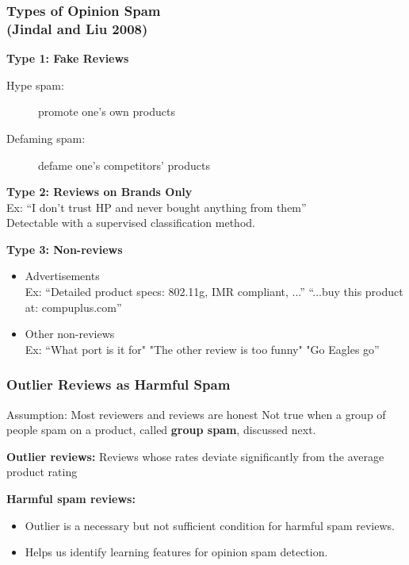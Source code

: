 \documentclass[t]{beamer}
\begin{document}
\begin{frame} \frametitle{Types of Opinion Spam \\ \small{(Jindal and Liu 2008) 
}}  %
  
\textbf{Type 1: Fake Reviews}  \\
\begin{description}
\item [Hype spam:] promote one's own products  
\item [Defaming spam:] defame one's competitors' products
\end{description}

\vfill
\textbf{Type 2: Reviews on Brands Only} \\
Ex: ``I don't trust HP and never bought anything from them''\\
Detectable with a supervised classification method.

\vfill
\textbf{Type 3: Non-reviews} \\
\begin{itemize}
\item Advertisements \\
Ex: ``Detailed product specs: 802.11g, IMR compliant, ...'' ``...buy this product at: compuplus.com''
\item Other non-reviews \\
Ex: ``What port is it for" "The other review is too funny" "Go Eagles go''
\end{itemize}

\end{frame}




\begin{frame} \frametitle{Outlier Reviews as Harmful Spam} %

\begin{block}{Assumption: Most reviewers and reviews are honest}
Not true when a group of people spam on a product, called \textbf{group spam},
discussed next.
\end{block}
\vfill

\textbf{Outlier reviews:} Reviews whose rates deviate significantly from the average product rating 

\vfill
\textbf{Harmful spam reviews:}
\begin{itemize}
 \item Outlier is a necessary but not sufficient condition for harmful spam
reviews. 
\item Helps us identify learning features for opinion spam detection.
\end{itemize}


\end{frame}
\end{document}
